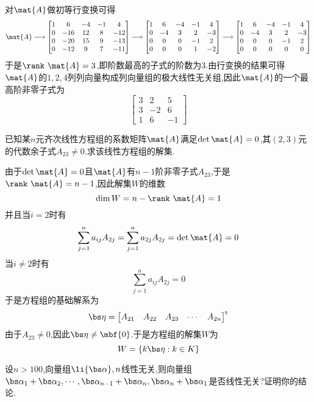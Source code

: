 \documentclass{ctexart}
\begin{document}
\begin{solution}
    对$\mat{A}$做初等行变换可得
    \[\mat{A}\longrightarrow\begin{bmatrix}
        1&6&-4&-1&4\\
        0&-16&12&8&-12\\
        0&-20&15&9&-13\\
        0&-12&9&7&-11
    \end{bmatrix}\longrightarrow\begin{bmatrix}
        1&6&-4&-1&4\\
        0&-4&3&2&-3\\
        0&0&0&-1&2\\
        0&0&0&1&-2
    \end{bmatrix}\longrightarrow\begin{bmatrix}
        1&6&-4&-1&4\\
        0&-4&3&2&-3\\
        0&0&0&-1&2\\
        0&0&0&0&0
    \end{bmatrix}\]
    于是$\rank\ \mat{A}=3$,即阶数最高的子式的阶数为$3$.由行变换的结果可得$\mat{A}$的$1,2,4$列列向量构成列向量组的极大线性无关组,因此$\mat{A}$的一个最高阶非零子式为
    \[\begin{bmatrix}
        3&2&5\\
        3&-2&6\\
        1&6&-1
    \end{bmatrix}\]
\end{solution}
\begin{homework}[6]
    已知某$n$元齐次线性方程组的系数矩阵$\mat{A}$满足$\det\mat{A}=0$,其$(2,3)$元的代数余子式$A_{23}\neq0$.求该线性方程组的解集.
\end{homework}
\begin{solution}
    由于$\det\mat{A}=0$且$\mat{A}$有$n-1$阶非零子式$A_{23}$,于是$\rank\ \mat{A}=n-1$,因此解集$W$的维数
    \[\dim{W}=n-\rank\ \mat{A}=1\]
    并且当$i=2$时有
    \[\sum_{j=1}^{n}a_{ij}A_{2j}=\sum_{j=1}^{n}a_{2j}A_{2j}=\det\mat{A}=0\]
    当$i\neq2$时有
    \[\sum_{j=1}^{n}a_{ij}A_{2j}=0\]
    于是方程组的基础解系为
    \[\bs\eta=\begin{bmatrix}
        A_{21}&A_{22}&A_{23}&\cdots&A_{2n}
    \end{bmatrix}^{\text{t}}\]
    由于$A_{23}\neq0$,因此$\bs\eta\neq\mbf{0}$.于是方程组的解集$W$为
    \[W=\left\{k\bs\eta:k\in K\right\}\]
\end{solution}
\begin{homework}[7]
    设$n>100$,向量组$\li{\bs\alpha},n$线性无关,则向量组$\bs\alpha_1+\bs\alpha_2,\cdots,\bs\alpha_{n-1}+\bs\alpha_n,\bs\alpha_n+\bs\alpha_1$是否线性无关?证明你的结论.
\end{homework}
\end{document}
